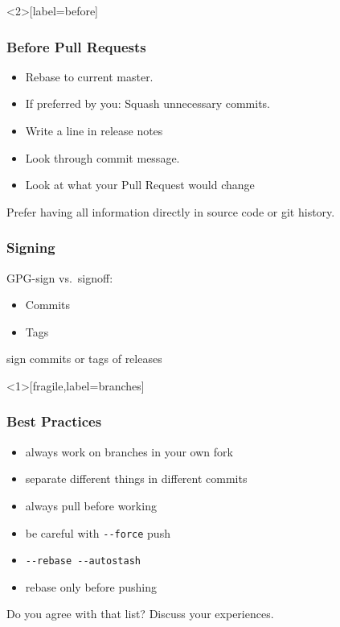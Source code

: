 \begin{frame}<2>[label=before]
	\frametitle{Before Pull Requests}

	\pause

	\begin{itemize}
		\item Rebase to current master.
		\item If preferred by you: Squash unnecessary commits.
		\item Write a line in release notes
		\item Look through commit message.
		\item Look at what your Pull Request would change
	\end{itemize}

	\begin{finding}
	Prefer having all information directly in source code or git history.
	\end{finding}
\end{frame}

\begin{frame}
	\frametitle{Signing}

	GPG-sign vs.\ signoff:
	\begin{itemize}
		\item Commits
		\item Tags
	\end{itemize}

	\begin{finding}
	sign commits or tags of releases
	\end{finding}
\end{frame}

\begin{frame}<1>[fragile,label=branches]
	\frametitle{Best Practices}
	\begin{itemize}
		\item always work on branches in your own fork
		\item separate different things in different commits
		\item always pull before working
		\item be careful with \verb+--force+ push
		\item \verb+--rebase --autostash+
		\item rebase only before pushing
	\end{itemize}

	\pause

	\begin{task}
	Do you agree with that list?
	Discuss your experiences.
	\end{task}
\end{frame}


